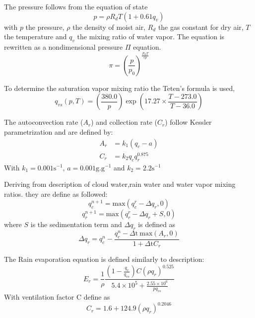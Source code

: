 \documentclass[times,doublespace]{fldauth}
\begin{document}
{\begin{appendix}
The pressure follows from the equation of state
\begin{equation}
p=\rho R_dT(1+0.61q_v)
\end{equation} with $p$ the pressure, $\rho$ the density of moist air, $R_d$ the gas constant for dry air, $T$ the temperature and $q_v$ the mixing ratio of water vapor. The equation is rewritten as a nondimensional pressure $\Pi$ equation.
\begin{equation}
\pi = \left(\frac{p}{p_0}\right)^{\frac{R_dT}{cp}}
\end{equation}

To determine the saturation vapor mixing ratio the Teten's formula is used,
\begin{equation}
q_{vs}(p,T) = \left( \frac{380.0}{p} \right) \exp\left(17.27 \times \frac{T-273.0}{T-36.0}\right)
\end {equation}

The autoconvection rate ($A_r$) and collection rate ($C_r$) follow Kessler parametrization and are defined by:
\begin{align}
A_r &= k_1(q_c-a) \\
C_r &= k_2q_cq_r^{0.875}
\end{align} With $k_1=0.001 \text{s}^{-1}$, $a=0.001 \text{g}.\text{g}^{-1}$ and $k_2=2.2 \text{s}^{-1}$ 

Deriving from \cite{klemp1978simulation} description of cloud water,rain water and water vapor mixing ratios. they are define as followed:
\begin{equation}
q_c^{n+1}=\mbox{max}(q_c^r-\Delta q_r,0)
\end{equation}
\begin{equation}
q_r^{n+1}=\mbox{max}(q_r^r-\Delta q_r+S,0)
\end{equation} where $S$ is the sedimentation term and $\Delta q_r$ is defined as
\begin{equation}
\Delta q_r=q_c^n-\frac{q_c^n-\Delta \text{t}\ \mbox{max}(A_r,0)}{1+\Delta \text{t} C_r}
\end{equation}

The Rain evaporation equation is defined similarly to \cite{ogura1971numerical} description:
\begin{equation}
E_r=\frac{1}{\rho}\frac{\left(1-\frac{q_v}{q_{vs}}\right)C(\rho q_r)^{0.525}}{5.4\times10^5+\frac{2.55\times10^6}{pq_{vs}}}
\end{equation}  With ventilation factor C define as 
\begin{equation}
C_r=1.6+124.9(\rho q_r)^{0.2046}
\label{venti}
\end{equation}


\end{appendix}}
\end{document}
